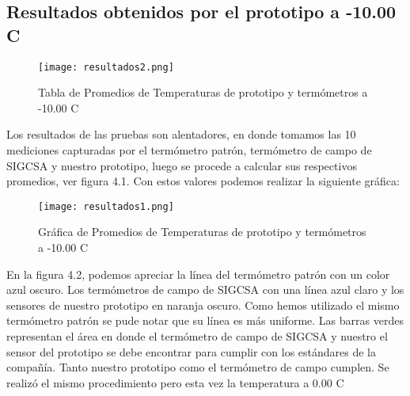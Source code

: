 \subsection{Resultados obtenidos por el prototipo a -10.00 C}

\begin{figure}[H]
	\centering
	\texttt{[image: resultados2.png]}
	\caption{Tabla de Promedios de Temperaturas de prototipo y termómetros a -10.00 C}
\end{figure}

\par \noindent 
Los resultados de las pruebas son alentadores, en donde tomamos las 10 mediciones capturadas por el termómetro patrón, termómetro de campo de SIGCSA y nuestro prototipo, luego se procede a calcular sus respectivos promedios, ver figura 4.1. Con estos valores podemos realizar la siguiente gráfica:

\begin{figure}[H]
	\centering
	\texttt{[image: resultados1.png]}
	\caption{Gráfica de Promedios de Temperaturas de prototipo y termómetros a -10.00 C}
\end{figure}

\par \noindent
En la figura 4.2, podemos apreciar la línea del termómetro patrón con un color azul oscuro. Los termómetros de campo de SIGCSA con una línea azul claro y los sensores de nuestro prototipo en naranja oscuro. Como hemos utilizado el mismo termómetro patrón se pude notar que su línea es más uniforme. Las barras verdes representan el área en donde el termómetro de campo de SIGCSA y nuestro el sensor del prototipo se debe encontrar para cumplir con los estándares de la compañía. Tanto nuestro prototipo como el termómetro de campo cumplen. Se realizó el mismo procedimiento pero esta vez la temperatura a 0.00 C

